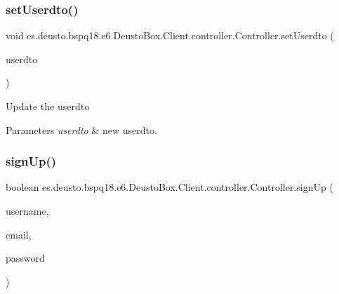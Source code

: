 \subsubsection{\texorpdfstring{set\+Userdto()}{setUserdto()}}
{\footnotesize\ttfamily void es.\+deusto.\+bspq18.\+e6.\+Deusto\+Box.\+Client.\+controller.\+Controller.\+set\+Userdto (\begin{DoxyParamCaption}\item[{\mbox{\hyperlink{classes_1_1deusto_1_1bspq18_1_1e6_1_1_deusto_box_1_1_server_1_1dto_1_1_d_user_d_t_o}{D\+User\+D\+TO}}}]{userdto }\end{DoxyParamCaption})}

Update the userdto 
\begin{DoxyParams}{Parameters}
{\em userdto} & new userdto. \\
\hline
\end{DoxyParams}
\mbox{\label{classes_1_1deusto_1_1bspq18_1_1e6_1_1_deusto_box_1_1_client_1_1controller_1_1_controller_a3cf016bbe56cf63e0268ed78aa7beb31}} 
\subsubsection{\texorpdfstring{sign\+Up()}{signUp()}}
{\footnotesize\ttfamily boolean es.\+deusto.\+bspq18.\+e6.\+Deusto\+Box.\+Client.\+controller.\+Controller.\+sign\+Up (\begin{DoxyParamCaption}\item[{String}]{username,  }\item[{String}]{email,  }\item[{String}]{password }\end{DoxyParamCaption})}

